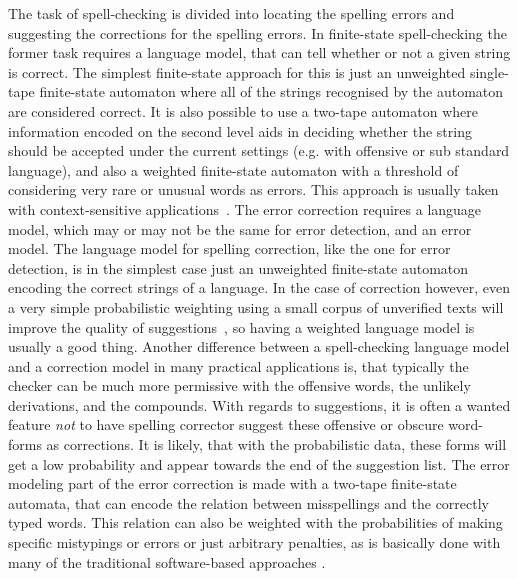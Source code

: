 \documentclass[a4paper,12pt]{article}
\begin{document}
The task of spell-checking is divided into locating the spelling errors and
suggesting the corrections for the spelling errors. In finite-state
spell-checking the former task requires a language model, that can tell whether
or not a given string is correct. The simplest finite-state approach for this
is just an unweighted single-tape finite-state automaton where all of the
strings recognised by the automaton are considered correct. It is also possible
to use a two-tape automaton where information encoded on the second level aids
in deciding whether the string should be accepted under the current settings
(e.g.  with offensive or sub standard language), and also a weighted
finite-state automaton with a threshold of considering very rare or unusual
words as errors.  This approach is usually taken with context-sensitive
applications~\cite[]{otero/2007}. The error correction requires a language
model, which may or may not be the same for error detection, and an error
model.  The language model for spelling correction, like the one for error
detection, is in the simplest case just an unweighted finite-state automaton
encoding the correct strings of a language. In the case of correction however,
even a very simple probabilistic weighting using a small corpus of unverified
texts will improve the quality of suggestions~\cite[]{pirinen/2010/lrec}, so
having a weighted language model is usually a good thing. Another difference
between a spell-checking language model and a correction model in many
practical applications is, that typically the checker can be much more
permissive with the offensive words, the unlikely derivations, and the
compounds. With regards to suggestions, it is often a wanted feature \emph{not}
to have spelling corrector suggest these offensive or obscure word-forms as
corrections. It is likely, that with the probabilistic data, these forms will
get a low probability and appear towards the end of the suggestion list. The
error modeling part of the error correction is made with a two-tape
finite-state automata, that can encode the relation between misspellings and
the correctly typed words. This relation can also be weighted with the
probabilities of making specific mistypings or errors or just arbitrary
penalties, as is basically done with many of the traditional software-based
approaches \cite[such as][]{Hunspell/manual}.
\end{document}
